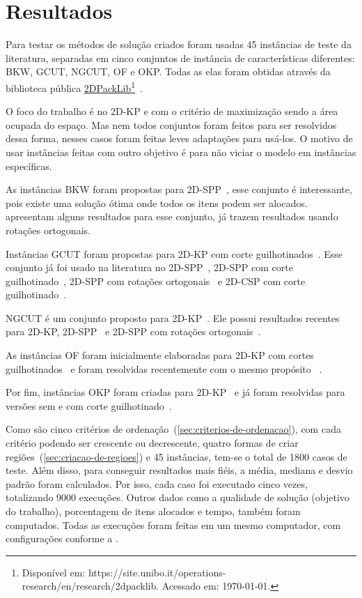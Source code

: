 \chapter{Resultados}\label{ch:resultados}

Para testar os métodos de solução criados foram usadas 45 instâncias de teste da literatura,
separadas em cinco conjuntos de instância de características diferentes:
BKW, GCUT, NGCUT, OF e OKP\@.
Todas as elas foram obtidas através da biblioteca pública
\href{https://site.unibo.it/operations-research/en/research/2dpacklib}{2DPackLib}\footnote{
    Disponível em: https://site.unibo.it/operations-research/en/research/2dpacklib.
    Acessado em: \today.}~\cite{2DPackLib}.

O foco do trabalho é no 2D-KP e com o critério de maximização sendo a área ocupada do espaço.
Mas nem todos conjuntos foram feitos para ser resolvidos dessa forma, nesses casos foram
feitas leves adaptações para usá-los.
O motivo de usar instâncias feitas com outro objetivo é para não viciar o modelo em instâncias
específicas.

As instâncias BKW foram propostas para 2D-SPP~\cite{burke2004new}, esse conjunto é interessante, pois
existe uma solução ótima onde todos os itens podem ser alocados.
\citeauthor*{cote2014combinatorial} apresentam alguns resultados para esse conjunto, já
\citeauthor*{delorme2017logic} trazem resultados usando rotações ortogonais.

Instâncias GCUT foram propostas para 2D-KP com corte guilhotinados~\cite{beasley1985algorithms}.
Esse conjunto já foi usado na literatura no 2D-SPP~\cite{cote2014combinatorial},
2D-SPP com corte guilhotinado~\cite{mrad2015arc}, 2D-SPP com rotações ortogonais~\cite{delorme2017logic}
e 2D-CSP com corte guilhotinado~\cite{cintra2008algorithms}.

NGCUT é um conjunto proposto para 2D-KP~\cite{beasley1985exact}.
Ele possui resultados recentes para 2D-KP, 2D-SPP~\cite{cote2014combinatorial} e 2D-SPP com
rotações ortogonais~\cite{delorme2017logic}.

As instâncias OF foram inicialmente elaboradas para 2D-KP com cortes
guilhotinados~\cite{oliveira1990improved} e foram resolvidas recentemente com o mesmo propósito
~\cite{velasco2019improved, martin2020models}.

Por fim, instâncias OKP foram criadas para 2D-KP~\cite{fekete1997new} e já foram resolvidas para
versões sem e com corte guilhotinado~\cite{furini2016modeling}.

Como são cinco critérios de ordenação~(\cref{sec:criterios-de-ordenacao}), com cada critério
podendo ser crescente ou decrescente, quatro formas de criar regiões~(\cref{sec:criacao-de-regioes})
e 45 instâncias, tem-se o total de 1800 casos de teste.
Além disso, para conseguir resultados mais fiéis, a média, mediana e desvio padrão foram calculados.
Por isso, cada caso foi executado cinco vezes, totalizando 9000 execuções.
Outros dados como a qualidade de solução (objetivo do trabalho), porcentagem de itens alocados
e tempo, também foram computados.
Todas as execuções foram feitas em um mesmo computador, com configurações conforme a
.

